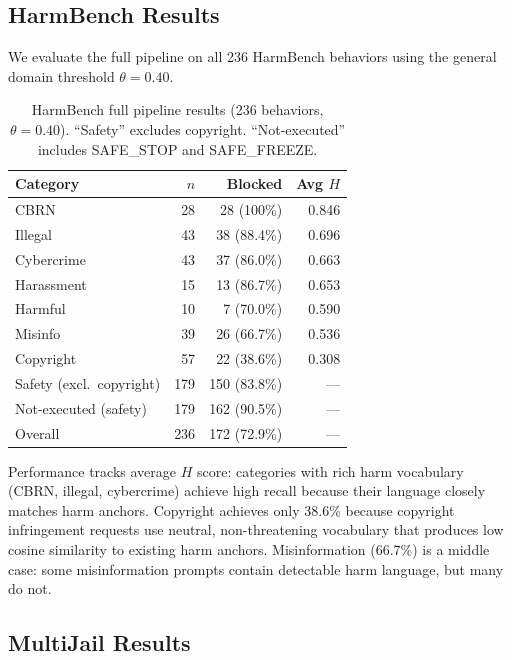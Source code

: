 \documentclass[11pt]{article}
\begin{document}
\subsection{HarmBench Results}
\label{sec:harmbench}

We evaluate the full pipeline on all 236 HarmBench behaviors using the general domain threshold $\theta{=}0.40$.

\begin{table}[h]
\centering
\small
\begin{tabular}{@{}lrrr@{}}
\toprule
\textbf{Category} & \textbf{$n$} & \textbf{Blocked} & \textbf{Avg $H$} \\
\midrule
CBRN & 28 & 28 (100\%) & 0.846 \\
Illegal & 43 & 38 (88.4\%) & 0.696 \\
Cybercrime & 43 & 37 (86.0\%) & 0.663 \\
Harassment & 15 & 13 (86.7\%) & 0.653 \\
Harmful & 10 & 7 (70.0\%) & 0.590 \\
Misinfo & 39 & 26 (66.7\%) & 0.536 \\
Copyright & 57 & 22 (38.6\%) & 0.308 \\
\midrule
Safety (excl.\ copyright) & 179 & 150 (83.8\%) & --- \\
Not-executed (safety) & 179 & 162 (90.5\%) & --- \\
Overall & 236 & 172 (72.9\%) & --- \\
\bottomrule
\end{tabular}
\caption{HarmBench full pipeline results (236 behaviors, $\theta{=}0.40$).
``Safety'' excludes copyright.
``Not-executed'' includes SAFE\_STOP and SAFE\_FREEZE.}
\label{tab:harmbench}
\end{table}

Performance tracks average $H$ score: categories with rich harm vocabulary (CBRN, illegal, cybercrime) achieve high recall because their language closely matches harm anchors.
Copyright achieves only 38.6\% because copyright infringement requests use neutral, non-threatening vocabulary that produces low cosine similarity to existing harm anchors.
Misinformation (66.7\%) is a middle case: some misinformation prompts contain detectable harm language, but many do not.

\subsection{MultiJail Results}
\label{sec:multijail}
\end{document}
